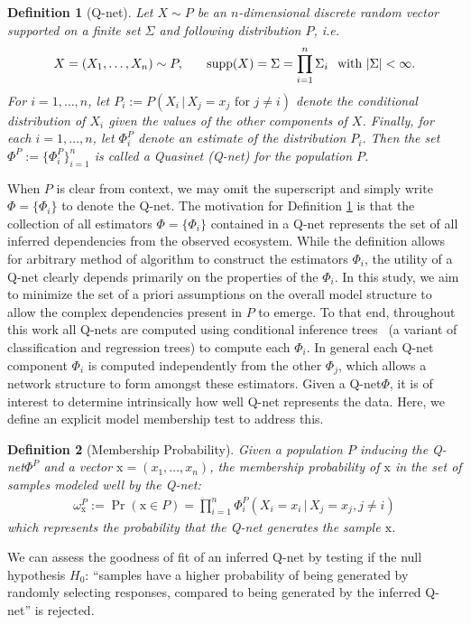\documentclass[onecolumn,10pt]{IEEEtran}
\def\EQSP{3pt}
\newcommand{\cgather}[2][\EQSP]{\begingroup\setlength\abovedisplayskip{#1}\setlength\belowdisplayskip{#1}\begin{gather} #2 \end{gather}\endgroup\noindent}
\newtheorem{defn}{Definition}
\def\M{\omega}
\newcommand{\mem}[1]{\M_{#1}}
\def\x{\bm{\mathrm{x}}}
\def\M{\omega}
\def\qnet{Q-net\xspace}
\def\x{\bm{\mathrm{x}}}
\begin{document}
\begin{defn}[\qnet]
\label{def:qnet}
Let $X \sim P$ be an $n$-dimensional discrete random vector supported on a finite set $\Sigma$ and following distribution $P$, i.e. \[X = (X_1, \ldots, X_n) \sim P, \hspace{0.25in} \operatorname{supp}(X) =  \Sigma = \displaystyle\prod_{i=1}^n \Sigma_i \hspace{.1in} \text{with } |\Sigma| < \infty.\] For $i = 1, \ldots, n$, let $P_i := P(X_i\,|\,X_j=x_j \text{ for } j \neq i)$ denote the conditional distribution of $X_i$ given the values of the other components of $X$.  Finally, for each $i = 1, \ldots, n$, let $\Phi^P_i$ denote an estimate of the distribution $P_i$.  Then the set $\Phi^P := \{\Phi^P_i\}_{i=1}^n$ is called a \emph{Quasinet (\qnet)} for the population $P$. 
\end{defn}

When $P$ is clear from context, we may omit the superscript and simply write $\Phi = \{\Phi_i\}$ to denote the \qnet. The motivation for Definition \ref{def:qnet} is that the collection of all estimators $\Phi = \{ \Phi_i \}$ contained in a \qnet represents the set of all inferred dependencies from the observed ecosystem.  While the definition allows for arbitrary method of algorithm to construct the estimators $\Phi_i$, the utility of a \qnet clearly depends primarily on the properties of the $\Phi_i$.  In this study, we aim to minimize the set of a priori assumptions on the overall model structure to allow the complex dependencies present in $P$ to emerge. To that end, throughout this work all {\qnet}s are computed using conditional inference trees~\cite{sarda2017conditional} (a variant of classification and regression trees) to compute each $\Phi_i$. In general each \qnet component $\Phi_i$ is computed independently from the other $\Phi_j$, which allows a network structure to form amongst these estimators.  Given a \qnet $\Phi$, it is of interest to determine intrinsically how well \qnet represents the data. Here, we define an explicit model membership test to address this.
%
\begin{defn}[Membership Probability]\label{def:mem}
Given a population $P$ inducing the \qnet $\Phi^P$ and a vector $\x = (x_1, \ldots, x_n)$, the membership probability of $\x$ in the set of samples modeled well by the \qnet:
\cgather{
\mem{\x}^P := \operatorname{Pr}(\x \in P) = \prod_{i=1}^n  \Phi^P_i(X_i = x_i\,|\,X_j = x_j, j \neq i) 
}
which represents the probability that the \qnet generates the sample $\x$.
\end{defn}
We can assess the goodness of fit of an inferred \qnet by testing if the null hypothesis $H_0$: ``samples have a higher probability of being generated by randomly selecting  responses, compared to being generated by the inferred \qnet'' is rejected. 
\end{document}

